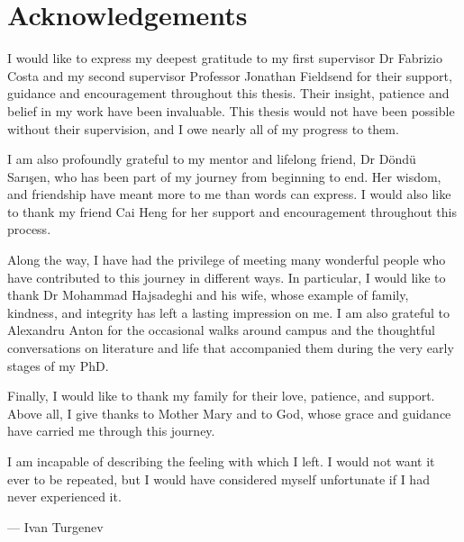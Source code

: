 \chapter*{Acknowledgements}



I would like to express my deepest gratitude to my first supervisor Dr Fabrizio Costa and my second supervisor Professor Jonathan Fieldsend for their support, guidance and encouragement throughout this thesis. Their insight, patience and belief in my work have been invaluable. This thesis would not have been possible without their supervision, and I owe nearly all of my progress to them.

I am also profoundly grateful to my mentor and lifelong friend, Dr Döndü Sarışen, who has been part of my journey from beginning to end. Her wisdom, and friendship have meant more to me than words can express.
I would also like to thank my friend Cai Heng for her support and encouragement throughout this process.

Along the way, I have had the privilege of meeting many wonderful people who have contributed to this journey in different ways. In particular, I would like to thank Dr Mohammad Hajsadeghi and his wife, whose example of family, kindness, and integrity has left a lasting impression on me. I am also grateful to Alexandru Anton for the occasional walks around campus and the thoughtful conversations on literature and life that accompanied them during the very early stages of my PhD.

Finally, I would like to thank my family for their love, patience, and support. Above all, I give thanks to Mother Mary and to God, whose grace and guidance have carried me through this journey.


\epigraph{I am incapable of describing the feeling with which I left. I would not want it ever to be repeated, but I would have considered myself unfortunate if I had never experienced it.}
{\normalsize --- \textup{Ivan Turgenev}}
